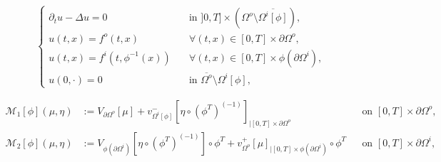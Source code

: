 \documentclass[10pt,a4paper]{amsart}
\begin{document}
\begin{equation}\label{princeqpertu}
\begin{cases}
    \partial_t u - \Delta u = 0 & \quad\text{in } ]0,T] \times (\Omega^o \setminus \overline{\Omega^i[\phi]}), 
    \\
    u(t,x) = f^o(t,x)& \quad \forall (t,x)\in [0,T] \times \partial \Omega^o, 
    \\
    u(t,x) = f^i(t,\phi^{-1}(x)) & \quad \forall (t,x)\in  [0,T] \times \phi(\partial\Omega^i),
    \\
    u(0,\cdot)=0 & \quad \text{in } \overline{\Omega^o} \setminus \Omega^i[\phi],
    \end{cases}
\end{equation}

\begin{equation}\label{eq M Dirichlet}
\begin{aligned}
\mathcal{M}_1[\phi](\mu,\eta) & := V_{\partial\Omega^o}[\mu] + v^-_{\Omega^i[\phi]}
\left[\eta \circ (\phi^T)^{(-1)}\right]_{|[0,T] \times \partial\Omega^o} && \text{on } [0,T] \times \partial \Omega^o,
\\
\mathcal{M}_2[\phi](\mu,\eta) & :=
V_{\phi(\partial\Omega^i)}\left[\eta \circ (\phi^T)^{(-1)}\right] \circ \phi^T + v^+_{\Omega^o}[\mu]_{|[0,T] \times \phi(\partial\Omega^i)}\circ \phi^T &&\text{on } [0,T] \times \partial \Omega^i,
\end{aligned}
\end{equation}
\end{document}
